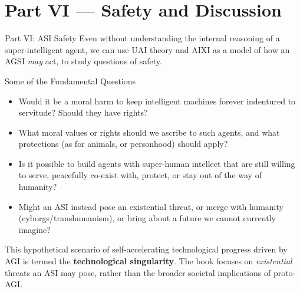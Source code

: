 \documentclass[aspectratio=169,10pt]{beamer}
\begin{document}
\section{Part VI --- Safety and Discussion}

\begin{frame}{Part VI: ASI Safety}
  Even without understanding the internal reasoning of a super-intelligent
  agent, we can use UAI theory and AIXI as a model of how an AGSI \emph{may}
  act, to study questions of safety.

  \begin{block}{Some of the Fundamental Questions}
    \begin{itemize}
      \item Would it be a moral harm to keep intelligent machines forever
        indentured to servitude? Should they have rights?
      \item What moral values or rights should we ascribe to such agents,
        and what protections (as for animals, or personhood) should apply?
      \item Is it possible to build agents with super-human intellect that
        are still willing to serve, peacefully co-exist with, protect, or
        stay out of the way of humanity?
      \item Might an ASI instead pose an existential threat, or merge with
        humanity (cyborgs/transhumanism), or bring about a future we cannot
        currently imagine?
    \end{itemize}
  \end{block}
  This hypothetical scenario of self-accelerating technological progress
  driven by AGI is termed the \textbf{technological singularity}. The book
  focuses on \emph{existential} threats an ASI may pose, rather than the
  broader societal implications of proto-AGI.
\end{frame}
\end{document}
